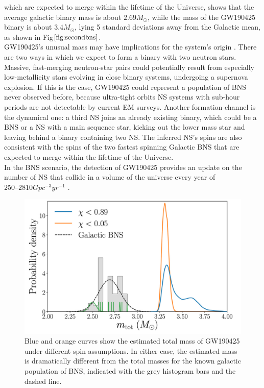 \documentclass[binding=0.6cm, LaM]{sapthesis}
\begin{document}
	which are expected to merge within the lifetime of the Universe, 
	shows that the average galactic binary mass is about $2.69 M_\odot$, 
	while the mass of the GW190425 binary is about $3.4 M_\odot$, 
	lying 5 standard deviations away from the Galactic mean, as shown in Fig$\ref{fig:secondbns}$. \\ 
	GW190425’s unusual mass may have implications for the system’s origin \cite{148}.
	There are two ways in which we expect to form a binary with two neutron stars. 
	Massive, fast-merging neutron-star pairs could potentially result from 
	especially low-metallicity stars evolving in close binary systems, undergoing a supernova explosion.
	If this is the case, GW190425 could represent a population of BNS never observed before, 
	because ultra-tight orbits NS systems with sub-hour periods are not detectable by current EM surveys.
	Another formation channel is the dynamical one: a third NS joins an already existing binary, 
	which could be a BNS or a NS with a main sequence star, kicking out the
	lower mass star and leaving behind a binary containing two NS.
	The inferred NS’s spins are also consistent with the spins of the two fastest 
	spinning Galactic BNS that are expected to merge within the lifetime of the Universe. \\
	In the BNS scenario, the detection of GW190425 provides an update 
	on the number of NS that collide in a volume of the universe every year of $250–2810 Gpc^{-3}yr^{-1}$ \cite{62}.
		\begin{figure}[H]
                        \label{secondbns}
                        \includegraphics[scale=0.3]{secondbns}
                        \centering
                        \caption{Blue and orange curves show the estimated total mass of GW190425 under different spin assumptions. In either case, the estimated mass is dramatically different from the total masses for the known galactic population of BNS, indicated with the grey histogram bars and the dashed line. \cite{62}}
		        \label{fig:secondbns}
                \end{figure}
\end{document}
